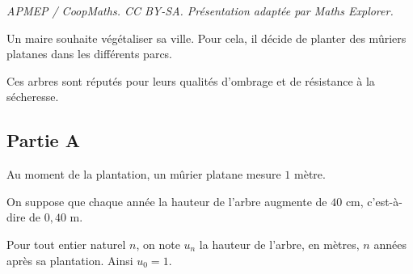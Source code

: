 \documentclass[10pt]{article}
\begin{document}
\noindent\textit{APMEP / CoopMaths. CC BY-SA. Présentation adaptée par Maths Explorer.}\par\medskip
Un maire souhaite végétaliser sa ville. Pour cela, il décide de planter des mûriers platanes dans les différents parcs.
			
			Ces arbres sont réputés pour leurs qualités d'ombrage et de résistance à la sécheresse.
			
			\subsection*{Partie A}
			
			Au moment de la plantation, un mûrier platane mesure $1$ mètre.
			
			On suppose que chaque année la hauteur de l'arbre augmente de $40$ cm, c'est-à-dire de $0{,}40$ m.
			
			Pour tout entier naturel $n$, on note $u_n$ la hauteur de l'arbre, en mètres, $n$ années après sa plantation. Ainsi $u_0=1$.
			
\end{document}
